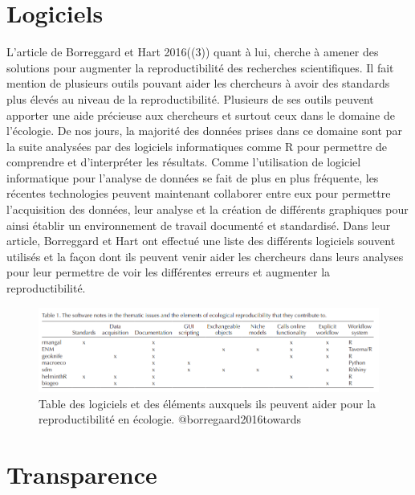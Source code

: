 \documentclass[9pt,twocolumn,twoside,]{pnas-new}
\begin{document}
\hypertarget{logiciels}{%
\section{Logiciels}\label{logiciels}}

L'article de Borreggard et Hart 2016((3)) quant à lui, cherche à amener
des solutions pour augmenter la reproductibilité des recherches
scientifiques. Il fait mention de plusieurs outils pouvant aider les
chercheurs à avoir des standards plus élevés au niveau de la
reproductibilité. Plusieurs de ses outils peuvent apporter une aide
précieuse aux chercheurs et surtout ceux dans le domaine de l'écologie.
De nos jours, la majorité des données prises dans ce domaine sont par la
suite analysées par des logiciels informatiques comme R pour permettre
de comprendre et d'interpréter les résultats. Comme l'utilisation de
logiciel informatique pour l'analyse de données se fait de plus en plus
fréquente, les récentes technologies peuvent maintenant collaborer entre
eux pour permettre l'acquisition des données, leur analyse et la
création de différents graphiques pour ainsi établir un environnement de
travail documenté et standardisé. Dans leur article, Borreggard et Hart
ont effectué une liste des différents logiciels souvent utilisés et la
façon dont ils peuvent venir aider les chercheurs dans leurs analyses
pour leur permettre de voir les différentes erreurs et augmenter la
reproductibilité.

\begin{figure}
\centering
\includegraphics{Borregaard2016.png}
\caption{Table des logiciels et des éléments auxquels ils peuvent aider
pour la reproductibilité en écologie. @borregaard2016towards}
\end{figure}

\hypertarget{transparence}{%
\section{Transparence}\label{transparence}}
\end{document}
